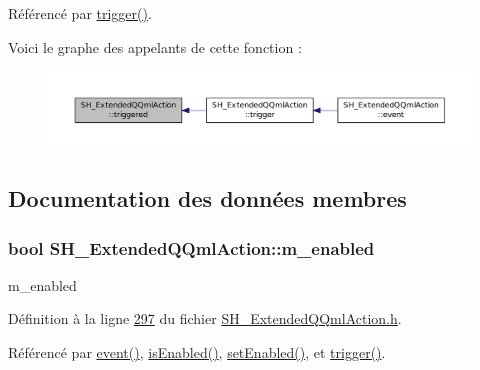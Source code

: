Référencé par \hyperlink{classSH__ExtendedQQmlAction_abf79bb6cb923d27e2fc5dfc05ff513c2}{trigger()}.



Voici le graphe des appelants de cette fonction \-:\nopagebreak
\begin{figure}[H]
\begin{center}
\leavevmode
\includegraphics[width=350pt]{classSH__ExtendedQQmlAction_a94a8d72f8d53e12ded7db5b8f6ed6db0_icgraph}
\end{center}
\end{figure}




\subsection{Documentation des données membres}
\hypertarget{classSH__ExtendedQQmlAction_ad93920806001da9e32b7b2a3d3d9213e}{
\subsubsection[{m\-\_\-enabled}]{\setlength{\rightskip}{0pt plus 5cm}bool S\-H\-\_\-\-Extended\-Q\-Qml\-Action\-::m\-\_\-enabled\hspace{0.3cm}{\ttfamily [private]}}}\label{classSH__ExtendedQQmlAction_ad93920806001da9e32b7b2a3d3d9213e}


m\-\_\-enabled 



Définition à la ligne \hyperlink{SH__ExtendedQQmlAction_8h_source_l00297}{297} du fichier \hyperlink{SH__ExtendedQQmlAction_8h_source}{S\-H\-\_\-\-Extended\-Q\-Qml\-Action.\-h}.



Référencé par \hyperlink{classSH__ExtendedQQmlAction_a218053d85e9fc54e06ab39b1bb37dd4b}{event()}, \hyperlink{classSH__ExtendedQQmlAction_a4da1f74b1aa64958ea18b2b55648b7db}{is\-Enabled()}, \hyperlink{classSH__ExtendedQQmlAction_aff39518e3dbf185d6b91f827521fa358}{set\-Enabled()}, et \hyperlink{classSH__ExtendedQQmlAction_abf79bb6cb923d27e2fc5dfc05ff513c2}{trigger()}.

